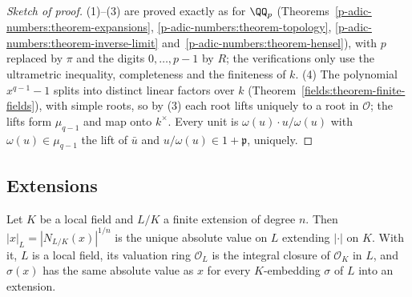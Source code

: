 \begin{proof}[Sketch of proof]
(1)--(3) are proved exactly as for $\QQ_p$ (Theorems~\ref{p-adic-numbers:theorem-expansions}, \ref{p-adic-numbers:theorem-topology}, \ref{p-adic-numbers:theorem-inverse-limit}
and~\ref{p-adic-numbers:theorem-hensel}), with $p$ replaced by $\pi$ and the digits $0, \dots, p - 1$ by $R$; the verifications only use the ultrametric inequality, completeness and the finiteness of
$k$. (4) The polynomial $x^{q-1} - 1$ splits into distinct linear factors over $k$ (Theorem~\ref{fields:theorem-finite-fields}), with simple roots, so by (3) each root lifts uniquely to a root in $\mathcal{O}$;
the lifts form $\mu_{q-1}$ and map onto $k^\times$. Every unit is $\omega(u) \cdot u/\omega(u)$ with $\omega(u) \in \mu_{q-1}$ the lift of $\bar u$ and $u/\omega(u) \in 1 + \mathfrak{p}$, uniquely.
\end{proof}

\subsection{Extensions}\label{local-fields:subsection-extensions}

\begin{theorem}\label{local-fields:theorem-extension-valuation}
Let $K$ be a local field and $L/K$ a finite extension of degree $n$. Then $|x|_L = |N_{L/K}(x)|^{1/n}$ is the unique absolute value on $L$ extending $|\cdot|$ on $K$. With it, $L$ is a local field, its
valuation ring $\mathcal{O}_L$ is the integral closure of $\mathcal{O}_K$ in $L$, and $\sigma(x)$ has the same absolute value as $x$ for every $K$-embedding $\sigma$ of $L$ into an extension.
\end{theorem}

